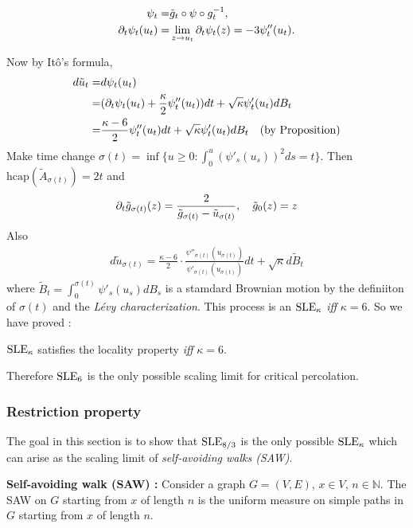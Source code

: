 \documentclass[12pt,a4paper]{article}
\begin{document}
\prop \begin{align*}
\psi_t =& \tilde{g}_t \circ \psi \circ g_t^{-1}, \\
\partial_t \psi_t (u_t) =& \lim_{z\rightarrow u_t} \partial_t \psi_t(z) =-3\psi_t''(u_t).
\end{align*}
\s

Now by It\^o's formula,
\begin{align*}
d\tilde{u}_t =& d\psi_t(u_t) \\
=& (\partial_t \psi_t(u_t) + \frac{\kappa}{2} \psi''_t(u_t))dt + \sqrt{\kappa} \psi'_t(u_t) dB_t \\
=& \frac{\kappa - 6}{2} \psi''_t (u_t) dt + \sqrt{\kappa} \psi'_t(u_t) dB_t \quad \text{(by Proposition)}
\end{align*}
Make time change $\sigma(t) = \inf \{u\geq 0 : \int_0^u (\psi'_s(u_s))^2 ds =t \}$. Then $\text{hcap}(\tilde{A}_{\sigma(t)}) = 2t$ and
\begin{align*}
\partial_t \tilde{g}_{\sigma(t)}(z)  = \frac{2}{\tilde{g}_{\sigma(t)} - \tilde{u}_{\sigma(t)} }, \quad \tilde{g}_0(z) =z
\end{align*}
Also
\begin{align*}
d\tilde{u}_{\sigma(t)} = \frac{\kappa -6}{2} \cdot \frac{\psi''_{\sigma(t)}(u_{\sigma(t)})}{\psi'_{\sigma(t)}(u_{\sigma(t)})} dt + \sqrt{\kappa} d\tilde{B}_t
\end{align*}
where $\tilde{B}_t = \int_0^{\sigma(t)} \psi'_s(u_s)dB_s$ is a stamdard Brownian motion by the definiiton of $\sigma(t)$ and the \emph{L\'evy characterization}. This process is an $\text{SLE}_{\kappa}$ \emph{iff} $\kappa =6$. So we have proved :
\s

\thm $\text{SLE}_{\kappa}$ satisfies the locality property \emph{iff} $\kappa =6$.
\s

Therefore $\text{SLE}_{6}$ is the only possible scaling limit for critical percolation. 
\s

\subsubsection*{Restriction property}

The goal in this section is to show that $\text{SLE}_{8/3}$ is the only possible $\text{SLE}_{\kappa}$ which can arise as the scaling limit of \emph{self-avoiding walks (SAW)}.
\s

\textbf{Self-avoiding walk (SAW) :} Consider a graph $G =(V,E)$, $x \in V$, $n\in\mathbb{N}$. The SAW on $G$ starting from $x$ of length $n$ is the uniform measure on simple paths in $G$ starting from $x$ of length $n$.
\end{document}
